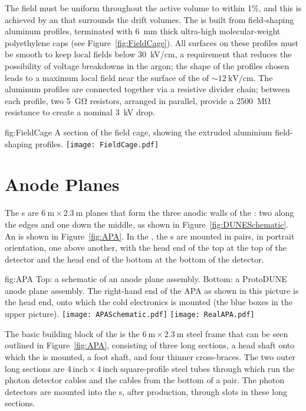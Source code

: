 The field must be uniform throughout the active  volume to within 1\%, and this is achieved by an  that surrounds the drift volumes. The  is built from field-shaping aluminum profiles, terminated with \SI{6}{\mm} thick ultra-high molecular-weight polyethylene caps (see Figure~\ref{fig:FieldCage}). All surfaces on these profiles must be smooth to keep local fields below \SI{30}{\kilo\volt/\cm}, a requirement that reduces the possibility of voltage breakdowns in the argon; the shape of the profiles chosen leads to a maximum local field near the surface of the  of $\sim\!\SI{12}{\kilo\volt/\cm}$. The aluminum profiles are connected together via a resistive divider chain; between each profile, two \SI{5}{\giga\ohm} resistors, arranged in parallel, provide a \SI{2500}{\mega\ohm} resistance to create a nominal \SI{3}{\kilo\volt} drop.

\begin{dunefigure}{fig:FieldCage}
{A section of the field cage, showing the extruded aluminium field-shaping profiles.}
\texttt{[image: FieldCage.pdf]}
\end{dunefigure}

\section{Anode Planes}
\label{sec:fdsp-exec-apas}

The s are $\SI{6}{\meter}\times\SI{2.3}{\meter}$ planes that form the three anodic walls of the : two along the edges and one down the middle, as shown in Figure~\ref{fig:DUNESchematic}. An  is shown in Figure~\ref{fig:APA}. In the , the s are mounted in pairs, in portrait orientation, one above another, with the head end of the top  at the top of the detector and the head end of the bottom  at the bottom of the detector.

\begin{dunefigure}{fig:APA}
{Top: a schematic of an anode plane assembly. Bottom: a ProtoDUNE anode plane assembly. The right-hand end of the APA as shown in this picture is the head end, onto which the cold electronics is mounted (the blue boxes in the upper picture). }
\texttt{[image: APASchematic.pdf]}
\texttt{[image: RealAPA.pdf]}
\end{dunefigure}

The basic building block of the  is the $\SI{6}{\meter}\times\SI{2.3}{\meter}$ steel frame that can be seen outlined in Figure~\ref{fig:APA}, consisting of three long sections, a head shaft onto which the  is mounted, a foot shaft, and four thinner cross-braces. The two outer long sections are $4\,\mathrm{inch}\times 4\,\mathrm{inch}$ square-profile steel tubes through which run the photon detector cables and the  cables from the bottom  of a pair. The photon detectors are mounted into the s, after production, through slots in these long sections.

